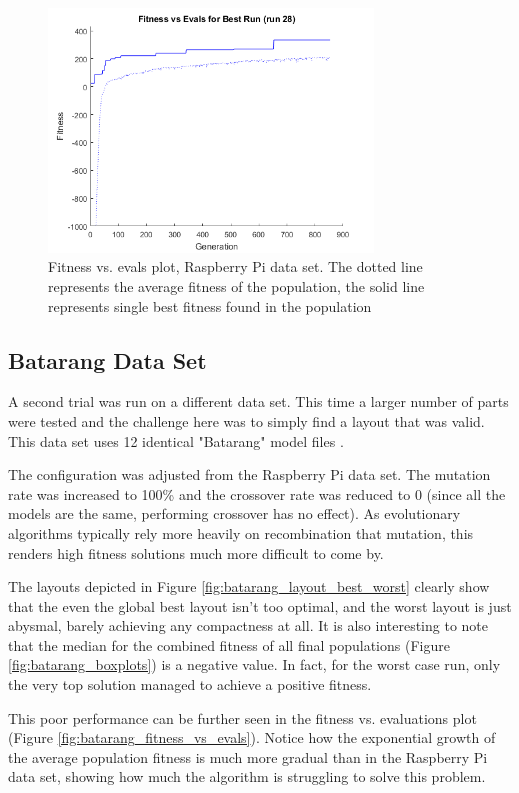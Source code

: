 \documentclass[conference]{IEEEtran}
\begin{document}
\begin{figure}[ht]
\centering
\includegraphics[width=3.4in]{dataset_rasbpi/fitness_vs_evals.png}
\caption{Fitness vs. evals plot, Raspberry Pi data set. The dotted line represents the average fitness of the population, the solid line represents single best fitness found in the population}
\label{fig:rasbpi_fitness_vs_evals}
\end{figure}

\subsection{Batarang Data Set}\label{batarang_dataset}
A second trial was run on a different data set. This time a larger number of parts were tested and the challenge here was to simply find a layout that was valid. This data set uses 12 identical "Batarang" model files \cite{model_batarang}.

The configuration was adjusted from the Raspberry Pi data set. The mutation rate was increased to 100\% and the crossover rate was reduced to 0 (since all the models are the same, performing crossover has no effect). As evolutionary algorithms typically rely more heavily on recombination that mutation\cite{ea_param_overview}, this renders high fitness solutions much more difficult to come by. 

The layouts depicted in Figure \ref{fig:batarang_layout_best_worst} clearly show that the even the global best layout isn't too optimal, and the worst layout is just abysmal, barely achieving any compactness at all.  It is also interesting to note that the median for the combined fitness of all final populations (Figure \ref{fig:batarang_boxplots}) is a negative value. In fact, for the worst case run, only the very top solution managed to achieve a positive fitness. 

This poor performance can be further seen in the fitness vs. evaluations plot (Figure \ref{fig:batarang_fitness_vs_evals}). Notice how the exponential growth of the average population fitness is much more gradual than in the Raspberry Pi data set, showing how much the algorithm is struggling to solve this problem.
\end{document}
